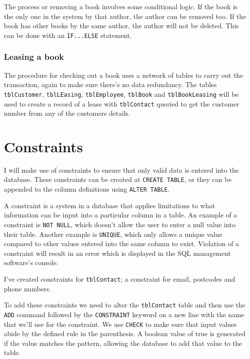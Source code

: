 \documentclass[11pt,a4paper]{scrartcl}
\begin{document}
	The process or removing a book involves some conditional logic. If the book is the only one in the system by that author, the author can be removed too. If the book has other books by the same author, the author will not be deleted. This can be done with an \texttt{IF...ELSE} statement.
		
	\subsubsection*{Leasing a book}
	
	The procedure for checking out a book uses a network of tables to carry out the transaction, again to make sure there's no data redundancy. The tables \texttt{tblCustomer}, \texttt{tblLEasing}, \texttt{tblEmployee}, \texttt{tblBook} and \texttt{tblBookLeasing} will be used to create a record of a lease with \texttt{tblContact} queried to get the customer number from any of the customers details.
	
	\section{Constraints}\label{constraints}
	
	I will make use of constraints to ensure that only valid data is entered into the database. These constraints can be created at \texttt{CREATE TABLE}, or they can be appended to the column definitions using \texttt{ALTER TABLE}.
	
	A constraint is a system in a database that applies limitations to what information can be input into a particular column in a table. An example of a constraint is \texttt{NOT NULL}, which doesn't allow the user to enter a null value into their table. Another example is \texttt{UNIQUE}, which only allows a unique value compared to other values entered into the same column to exist. Violation of a constraint will result in an error which is displayed in the SQL management software's console.
	
	I've created constraints for \texttt{tblContact}; a constraint for email, postcodes and phone numbers.
	
	
	
	To add these constraints we need to alter the \texttt{tblContact} table and then use the \texttt{ADD} command followed by the \texttt{CONSTRAINT} keyword on a new line with the name that we'll use for the constraint. We use \texttt{CHECK} to make sure that input values abide by the defined rule in the parenthesis. A boolean value of true is generated if the value matches the pattern, allowing the database to add that value to the table.
	
\end{document}
